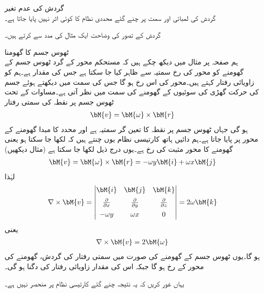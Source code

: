 \quad گردش کی عدم تغیر\\
گردش کی لمبائی اور سمت پر چنے گئے محددی نظام کا کوئی اثر نہیں پایا جاتا ہے۔

گردش کے تصور کی  وضاحت ایک مثال کی مدد سے کرتے ہیں۔

\quad ٹھوس جسم کا گھومنا\\
ہم صفحہ  پر مثال  میں دیکھ چکے ہیں کہ مستحکم محور کے گرد ٹھوس جسم کے گھومنے کو محور کی رخ سمتیہ
  سے ظاہر کیا جا سکتا ہے جس کی مقدار  ہے۔ہم  کو زاویائی رفتار کہتے ہیں۔محور کی اس رخ ہو گا جس کی سمت میں دیکھتے ہوئے  جسم کی حرکت گھڑی کی سوئیوں کے گھومنے کی سمت میں نظر آتی ہے۔مساوات  کے تحت ٹھوس جسم پر نقطہ  کی سمتی رفتار
\begin{align*}
\bM{v}=\bM{\omega}\times \bM{r}
\end{align*}
ہو گی جہاں  ٹھوس جسم پر نقطہ  کا تعین گر سمتیہ   ہے اور محدد کا مبدا گھومنے کے محور پر پایا جاتا ہے۔ہم دائیں ہاتھ کارتیسی نظام یوں چنتے ہیں کہ  لکھا جا سکتا ہو یعنی گھومنے کا محور مثبت  کی رخ ہے۔یوں درج ذیل لکھا جا سکتا ہے (مثال  دیکھیں)
\begin{align*}
\bM{v}=\bM{\omega}\times \bM{r}=-\omega y\bM{i}+\omega x\bM{j}
\end{align*} 
لہٰذا
\begin{align*}
\nabla \times \bM{v}=
\begin{vmatrix}
\bM{i}&\bM{j}&\bM{k}\\[0.5em]
\frac{\partial}{\partial x}& \frac{\partial}{\partial y}&\frac{\partial}{\partial z}\\[0.5em]
-\omega y&\omega x&0
\end{vmatrix}=
2\omega \bM{k}
\end{align*}
یعنی
\begin{align}
\nabla \times \bM{v}=2\bM{\omega}
\end{align}
ہو گا۔یوں ٹھوس جسم کے گھومنے کی صورت میں سمتی رفتار کی گردش، گھومنے کی محور کے رخ ہو گا جبکہ اس کی مقدار زاویائی رفتار کی دگنا ہو گی۔

یہاں غور کریں کہ یہ نتیجہ چنے گئے کارتیسی نظام پر منحصر نہیں ہے۔ 

